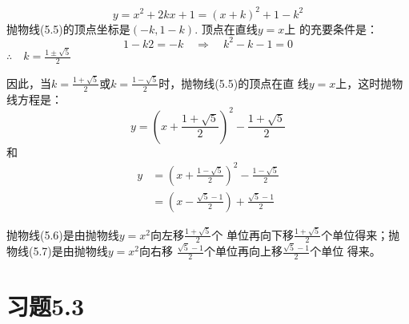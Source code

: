 \begin{solution}
\begin{equation}
    y=x^2+2kx+1=(x+k)^2+1-k^2
\end{equation}
抛物线(5.5)的顶点坐标是$(-k,1-k)$. 顶点在直线$y=x$上
的充要条件是：
\[1-k2=-k\quad \Rightarrow\quad k^2-k-1=0\]
$\therefore\quad k=\frac{1\pm\sqrt{5}}{2}$

因此，当$k=\frac{1+\sqrt{5}}{2}$或$k=\frac{1-\sqrt{5}}{2}$时，抛物线(5.5)的顶点在直
线$y=x$上，这时抛物线方程是：
\begin{equation}
y=\left(x+\frac{1+\sqrt{5}}{2}\right)^2-\frac{1+\sqrt{5}}{2}
\end{equation}
和
\begin{equation}
    \begin{split}
 y&=\left(x+\frac{1-\sqrt{5}}{2}\right)^2-\frac{1-\sqrt{5}}{2}\\
&=\left(x-\frac{\sqrt{5}-1}{2}\right)+\frac{\sqrt{5}-1}{2}
    \end{split}
\end{equation}  

抛物线(5.6)是由抛物线$y=x^2$向左移$\frac{1+\sqrt{5}}{2}$个
单位再向下移$\frac{1+\sqrt{5}}{2}$个单位得来；抛物线(5.7)是由抛物线$y=x^2$向右移
$\frac{\sqrt{5}-1}{2}$个单位再向上移$\frac{\sqrt{5}-1}{2}$个单位
得来。
\end{solution}

\section*{习题5.3}

